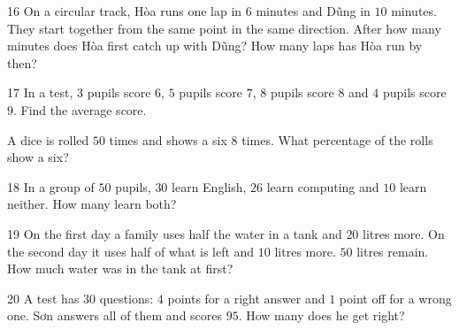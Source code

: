 \gap
\begin{probbox}{16}{}
On a circular track, Hòa runs one lap in $6$ minutes and Dũng in $10$ minutes. They start together from the same point in the same direction. After how many minutes does Hòa first catch up with Dũng? How many laps has Hòa run by then?
\end{probbox}
\gap
\begin{probbox}{17}{\relax}
 In a test, $3$ pupils score $6$, $5$ pupils score $7$, $8$ pupils score $8$ and $4$ pupils score $9$. Find the average score.\par
{} A dice is rolled $50$ times and shows a six $8$ times. What percentage of the rolls show a six?
\end{probbox}
\gap
\begin{probbox}{18}{\relax}
In a group of $50$ pupils, $30$ learn English, $26$ learn computing and $10$ learn neither. How many learn both?
\end{probbox}
\gap
\begin{probbox}{19}{}
On the first day a family uses half the water in a tank and $20$ litres more. On the second day it uses half of what is left and $10$ litres more. $50$ litres remain. How much water was in the tank at first?
\end{probbox}
\gap
\begin{probbox}{20}{}
A test has $30$ questions: $4$ points for a right answer and $1$ point off for a wrong one. Sơn answers all of them and scores $95$. How many does he get right?
\end{probbox}

